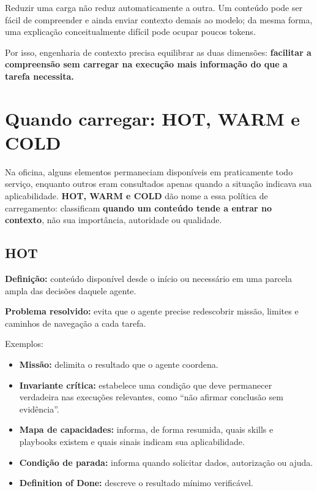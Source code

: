 \documentclass[
  10pt,
  a4paper,
  oneside]{book}
\providecommand{\tightlist}{%
  \setlength{\itemsep}{0pt}\setlength{\parskip}{0pt}}
\begin{document}
Reduzir uma carga não reduz automaticamente a outra. Um conteúdo pode
ser fácil de compreender e ainda enviar contexto demais ao modelo; da
mesma forma, uma explicação conceitualmente difícil pode ocupar poucos
tokens.

Por isso, engenharia de contexto precisa equilibrar as duas dimensões:
\textbf{facilitar a compreensão sem carregar na execução mais informação
do que a tarefa necessita.}

\hypertarget{quando-carregar-hot-warm-e-cold}{%
\section{Quando carregar: HOT, WARM e
COLD}\label{quando-carregar-hot-warm-e-cold}}

Na oficina, alguns elementos permaneciam disponíveis em praticamente
todo serviço, enquanto outros eram consultados apenas quando a situação
indicava sua aplicabilidade. \textbf{HOT, WARM e COLD} dão nome a essa
política de carregamento: classificam \textbf{quando um conteúdo tende a
entrar no contexto}, não sua importância, autoridade ou qualidade.

\hypertarget{hot}{%
\subsection{HOT}\label{hot}}

\textbf{Definição:} conteúdo disponível desde o início ou necessário em
uma parcela ampla das decisões daquele agente.

\textbf{Problema resolvido:} evita que o agente precise redescobrir
missão, limites e caminhos de navegação a cada tarefa.

Exemplos:

\begin{itemize}
\tightlist
\item
  \textbf{Missão:} delimita o resultado que o agente coordena.
\item
  \textbf{Invariante crítica:} estabelece uma condição que deve
  permanecer verdadeira nas execuções relevantes, como ``não afirmar
  conclusão sem evidência''.
\item
  \textbf{Mapa de capacidades:} informa, de forma resumida, quais skills
  e playbooks existem e quais sinais indicam sua aplicabilidade.
\item
  \textbf{Condição de parada:} informa quando solicitar dados,
  autorização ou ajuda.
\item
  \textbf{Definition of Done:} descreve o resultado mínimo verificável.
\end{itemize}
\end{document}
